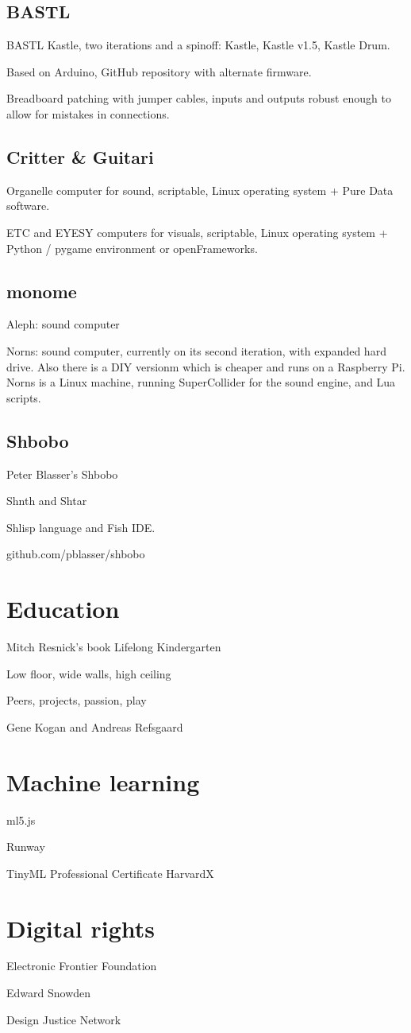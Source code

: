 \subsection{BASTL}

BASTL Kastle, two iterations and a spinoff: Kastle, Kastle v1.5, Kastle Drum. 

Based on Arduino, GitHub repository with alternate firmware.

Breadboard patching with jumper cables, inputs and outputs robust enough to allow for mistakes in connections.

\subsection{Critter \& Guitari}

Organelle computer for sound, scriptable, Linux operating system + Pure Data software.

ETC and EYESY computers for visuals, scriptable, Linux operating system + Python / pygame environment or openFrameworks.

\subsection{monome}

Aleph: sound computer

Norns: sound computer, currently on its second iteration, with expanded hard drive. Also there is a DIY versionm which is cheaper and runs on a Raspberry Pi.
Norns is a Linux machine, running SuperCollider for the sound engine, and Lua scripts.

\subsection{Shbobo}

Peter Blasser's Shbobo

Shnth and Shtar

Shlisp language and Fish IDE.

github.com/pblasser/shbobo

\section{Education}

Mitch Resnick's book Lifelong Kindergarten

Low floor, wide walls, high ceiling

Peers, projects, passion, play

Gene Kogan and Andreas Refsgaard

\section{Machine learning}

ml5.js

Runway

TinyML Professional Certificate HarvardX

\section{Digital rights}

Electronic Frontier Foundation

Edward Snowden

Design Justice Network

